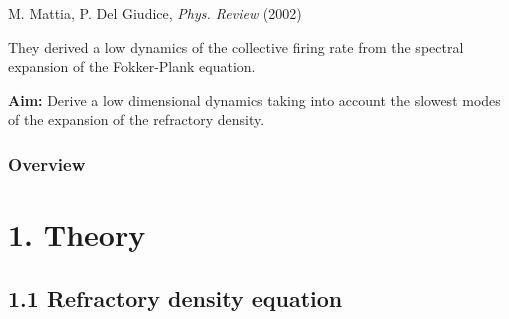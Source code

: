 \documentclass{beamer}
\begin{document}
\begin{frame}
\pause
\vspace{1.2cm}
M. Mattia, P. Del Giudice,  \textit{Phys. Review} (2002)

They derived a low dynamics of the collective firing rate from the spectral expansion of the Fokker-Plank equation.

\vspace{0.8cm}
\pause
\begin{mybox}
	\textbf{Aim: } Derive a low dimensional dynamics taking into account the slowest modes of the expansion of the refractory density.

\end{mybox}

\end{frame}



\begin{frame}
\frametitle{Overview}%
\tableofcontents %
\end{frame}




\section{1. Theory}
\subsection{1.1 Refractory density equation}
\end{document}
